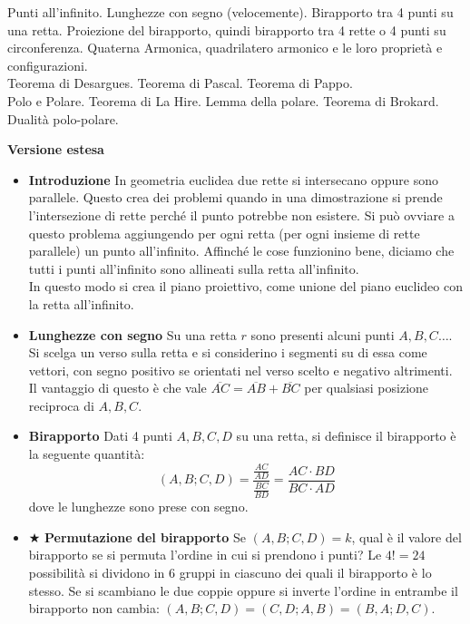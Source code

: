 \begin{short}
 Punti all'infinito. Lunghezze con segno (velocemente). Birapporto tra 4 punti su una retta. Proiezione del birapporto, quindi birapporto tra 4 rette o 4 punti su circonferenza. Quaterna Armonica, quadrilatero armonico e le loro proprietà e configurazioni. \\
 Teorema di Desargues. Teorema di Pascal. Teorema di Pappo. \\
 Polo e Polare. Teorema di La Hire. Lemma della polare. Teorema di Brokard.  Dualità polo-polare. 
\end{short}



\vspace{0.3cm}
\large{\textbf{Versione estesa}}\normalsize
\begin{itemize}

\vspace{0.3cm}
\item \textbf{Introduzione} In geometria euclidea due rette si intersecano oppure sono parallele. Questo crea dei problemi quando in una dimostrazione si prende l'intersezione di rette perché il punto potrebbe non esistere. Si può ovviare a questo problema aggiungendo per ogni retta (per ogni insieme di rette parallele) un punto all'infinito.  Affinché le cose funzionino bene, diciamo che tutti i punti all'infinito sono allineati sulla retta all'infinito.\\
In questo modo si crea il piano proiettivo, come unione del piano euclideo con la retta all'infinito.


\item \textbf{Lunghezze con segno} Su una retta $r$ sono presenti alcuni punti $A,B,C\ldots$. Si scelga un verso sulla retta e si considerino i segmenti su di essa come vettori, con segno positivo se orientati nel verso scelto e negativo altrimenti. Il vantaggio di questo è che vale $\overline{AC}=\overline{AB}+\overline{BC}$ per qualsiasi posizione reciproca di $A,B,C$.

\item \textbf{Birapporto} Dati 4 punti $A,B,C,D$ su una retta, si definisce il birapporto è la seguente quantità:
$$(A,B;C,D)=\frac{\frac{AC}{AD}}{\frac{BC}{BD}}=\frac{AC\cdot BD}{BC\cdot AD}$$
dove le lunghezze sono prese con segno.

\item $\bigstar$ \textbf{Permutazione del birapporto} Se $(A,B;C,D)=k$, qual è il valore del birapporto se si permuta l'ordine in cui si prendono i punti? Le $4!=24$ possibilità si dividono in $6$ gruppi in ciascuno dei quali il birapporto è lo stesso. Se si scambiano le due coppie oppure si inverte l'ordine in entrambe il birapporto non cambia: $(A,B;C,D)=(C,D;A,B)=(B,A;D,C)$.


\end{itemize}
